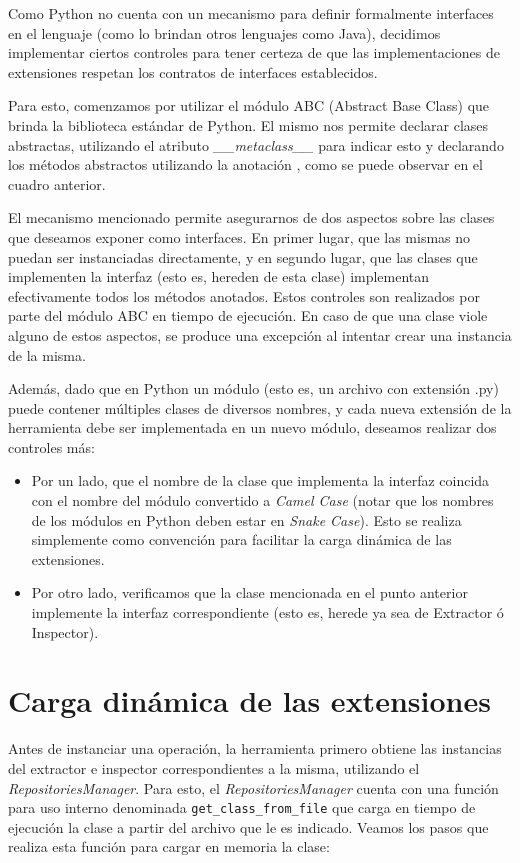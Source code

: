 Como Python no cuenta con un mecanismo para definir formalmente interfaces en el lenguaje (como lo brindan otros lenguajes como Java), decidimos implementar ciertos controles para tener certeza de que las implementaciones de extensiones respetan los contratos de interfaces establecidos.

Para esto, comenzamos por utilizar el módulo ABC (Abstract Base Class) que brinda la biblioteca estándar de Python. El mismo nos permite declarar clases abstractas, utilizando el atributo \emph{\_\_metaclass\_\_} para indicar esto y declarando los métodos abstractos utilizando la anotación \emph{\@abstractmethod}, como se puede observar en el cuadro anterior.

El mecanismo mencionado permite asegurarnos de dos aspectos sobre las clases que deseamos exponer como interfaces. En primer lugar, que las mismas no puedan ser instanciadas directamente, y en segundo lugar, que las clases que implementen la interfaz (esto es, hereden de esta clase) implementan efectivamente todos los métodos anotados. Estos controles son realizados por parte del módulo ABC en tiempo de ejecución. En caso de que una clase viole alguno de estos aspectos, se produce una excepción al intentar crear una instancia de la misma.

Además, dado que en Python un módulo (esto es, un archivo con extensión .py) puede contener múltiples clases de diversos nombres, y cada nueva extensión de la herramienta debe ser implementada en un nuevo módulo, deseamos realizar dos controles más:

\begin{itemize}
\item Por un lado, que el nombre de la clase que implementa la interfaz coincida con el nombre del módulo convertido a \emph{Camel Case} (notar que los nombres de los módulos en Python deben estar en \emph{Snake Case}). Esto se realiza simplemente como convención para facilitar la carga dinámica de las extensiones.
\item Por otro lado, verificamos que la clase mencionada en el punto anterior implemente la interfaz correspondiente (esto es, herede ya sea de Extractor ó Inspector).
\end{itemize}

\section{Carga dinámica de las extensiones}
Antes de instanciar una operación, la herramienta primero obtiene las instancias del extractor e inspector correspondientes a la misma, utilizando el \emph{RepositoriesManager}. Para esto, el \emph{RepositoriesManager} cuenta con una función para uso interno denominada \texttt{get\_class\_from\_file} que carga en tiempo de ejecución la clase a partir del archivo que le es indicado. Veamos los pasos que realiza esta función para cargar en memoria la clase:

